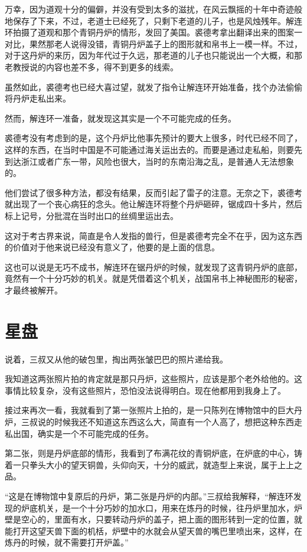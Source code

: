 万幸，因为道观十分的偏僻，并没有受到太多的滋扰，在风云飘摇的十年中奇迹般地保存了下来，不过，老道士已经死了，只剩下老道的儿子，也是风烛残年。解连环拍摄了道观和那个青铜丹炉的情形，发回了美国。裘德考拿出翻译出来的图案一对比，果然那老人说得没错，青铜丹炉盖子上的图形就和帛书上一模一样。不过，对于这丹炉的来历，因为年代过于久远，那老道的儿子也只能说出一个大概，和那老教授说的内容也差不多，得不到更多的线索。

虽然如此，裘德考也已经大喜过望，就发了指令让解连环开始准备，找个办法偷偷将丹炉走私出来。

然而，解连环一准备，就发现这其实是一个不可能完成的任务。

裘德考没有考虑到的是，这个丹炉比他事先预计的要大上很多，时代已经不同了，这样的东西，在当时中国是不可能通过海关运出去的。而要是通过走私船，则要先到达浙江或者广东一带，风险也很大，当时的东南沿海之乱，是普通人无法想象的。

他们尝试了很多种方法，都没有结果，反而引起了雷子的注意。无奈之下，裘德考就出现了一个丧心病狂的念头。他让解连环将整个丹炉砸碎，锯成四十多片，然后标上记号，分批混在当时出口的丝绸里运出去。

这对于考古界来说，简直是令人发指的兽行，但是裘德考完全不在乎，因为这东西的价值对于他来说已经没有意义了，他要的是上面的信息。

这也可以说是无巧不成书，解连环在锯丹炉的时候，就发现了这青铜丹炉的底部，竟然有一个十分巧妙的机关。就是凭借着这个机关，战国帛书上神秘图形的秘密，才最终被解开。

\chapter{星盘}

说着，三叔又从他的破包里，掏出两张皱巴巴的照片递给我。

我知道这两张照片拍的肯定就是那只丹炉，这些照片，应该是那个老外给他的。这事情比较复杂，没有这些照片，恐怕没法说得明白。现在他都用到我身上了。

接过来再次一看，我就看到了第一张照片上拍的，是一只陈列在博物馆中的巨大丹炉，三叔说的时候我还不知道这东西这么大，简直有一个人高了，想把这种东西走私出国，确实是一个不可能完成的任务。

第二张，则是丹炉底部的情形，我看到了布满花纹的青铜炉底，在炉底的中心，铸着一只拳头大小的望天铜兽，头仰向天，十分的威武，就造型上来说，属于上上之品。

“这是在博物馆中复原后的丹炉，第二张是丹炉的内部。”三叔给我解释，“解连环发现的炉底机关，是一个十分巧妙的加水口，用来在炼丹的时候，往丹炉里加水，炉壁是空心的，里面有水，只要转动丹炉的盖子，把上面的图形转到一定的位置，就能打开这望天兽下面的机栝，炉壁中的水就会从望天兽的嘴巴里喷出来，这样，在炼丹的时候，就不需要打开炉盖。”

